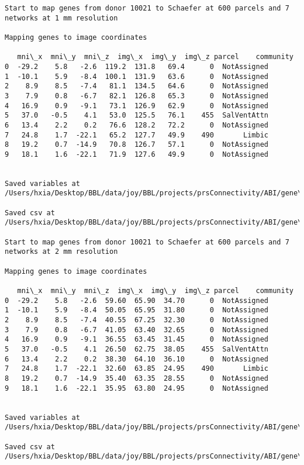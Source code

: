 \documentclass[11pt]{article}
\begin{document}
\begin{Verbatim}[commandchars=\\\{\}]
Start to map genes from donor 10021 to Schaefer at 600 parcels and 7 networks at 1 mm resolution

Mapping genes to image coordinates

   mni\_x  mni\_y  mni\_z  img\_x  img\_y  img\_z parcel    community
0  -29.2    5.8   -2.6  119.2  131.8   69.4      0  NotAssigned
1  -10.1    5.9   -8.4  100.1  131.9   63.6      0  NotAssigned
2    8.9    8.5   -7.4   81.1  134.5   64.6      0  NotAssigned
3    7.9    0.8   -6.7   82.1  126.8   65.3      0  NotAssigned
4   16.9    0.9   -9.1   73.1  126.9   62.9      0  NotAssigned
5   37.0   -0.5    4.1   53.0  125.5   76.1    455  SalVentAttn
6   13.4    2.2    0.2   76.6  128.2   72.2      0  NotAssigned
7   24.8    1.7  -22.1   65.2  127.7   49.9    490       Limbic
8   19.2    0.7  -14.9   70.8  126.7   57.1      0  NotAssigned
9   18.1    1.6  -22.1   71.9  127.6   49.9      0  NotAssigned


Saved variables at /Users/hxia/Desktop/BBL/data/joy/BBL/projects/prsConnectivity/ABI/gene\_mapping/10021donor\_600Parcels\_7Network\_1mm.pkl

Saved csv at /Users/hxia/Desktop/BBL/data/joy/BBL/projects/prsConnectivity/ABI/gene\_mapping/10021donor\_600Parcels\_7Network\_1mm.csv

Start to map genes from donor 10021 to Schaefer at 600 parcels and 7 networks at 2 mm resolution

Mapping genes to image coordinates

   mni\_x  mni\_y  mni\_z  img\_x  img\_y  img\_z parcel    community
0  -29.2    5.8   -2.6  59.60  65.90  34.70      0  NotAssigned
1  -10.1    5.9   -8.4  50.05  65.95  31.80      0  NotAssigned
2    8.9    8.5   -7.4  40.55  67.25  32.30      0  NotAssigned
3    7.9    0.8   -6.7  41.05  63.40  32.65      0  NotAssigned
4   16.9    0.9   -9.1  36.55  63.45  31.45      0  NotAssigned
5   37.0   -0.5    4.1  26.50  62.75  38.05    455  SalVentAttn
6   13.4    2.2    0.2  38.30  64.10  36.10      0  NotAssigned
7   24.8    1.7  -22.1  32.60  63.85  24.95    490       Limbic
8   19.2    0.7  -14.9  35.40  63.35  28.55      0  NotAssigned
9   18.1    1.6  -22.1  35.95  63.80  24.95      0  NotAssigned


Saved variables at /Users/hxia/Desktop/BBL/data/joy/BBL/projects/prsConnectivity/ABI/gene\_mapping/10021donor\_600Parcels\_7Network\_2mm.pkl

Saved csv at /Users/hxia/Desktop/BBL/data/joy/BBL/projects/prsConnectivity/ABI/gene\_mapping/10021donor\_600Parcels\_7Network\_2mm.csv


\end{Verbatim}
\end{document}
